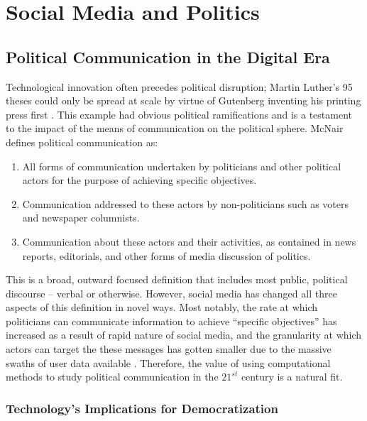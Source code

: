 \chapter{Social Media and Politics}\label{ch:SMandPolitics}

\section{Political Communication in the Digital Era}

Technological innovation often precedes political disruption; Martin Luther’s 95
theses could only be spread at scale by virtue of Gutenberg inventing his
printing press first \cite{gardels2019renovating}. This example had obvious
political ramifications and is a testament to the impact of the means of
communication on the political sphere. McNair defines political communication
as:

\begin{enumerate}    
    \item All forms of communication undertaken by politicians and other
    political actors for the purpose of achieving specific objectives.
    \item Communication addressed to these actors by non-politicians such as
    voters and newspaper columnists.
    \item Communication about these actors and their activities, as contained in news reports, editorials, and other forms of media discussion of politics. \cite{mcnair2017introduction}
\end{enumerate} 

This is a broad, outward focused definition that includes most public, political
discourse -- verbal or otherwise. However, social media has changed all three
aspects of this definition in novel ways. Most notably, the rate at which
politicians can communicate information to achieve “specific objectives” has
increased as a result of rapid nature of social media, and the granularity at
which actors can target the these messages has gotten smaller due to the massive
swaths of user data available \cite{nickerson2014political}. Therefore, the
value of using computational methods to study political communication in the
$21^{st}$ century is a natural fit.

\subsection{Technology's Implications for Democratization}

